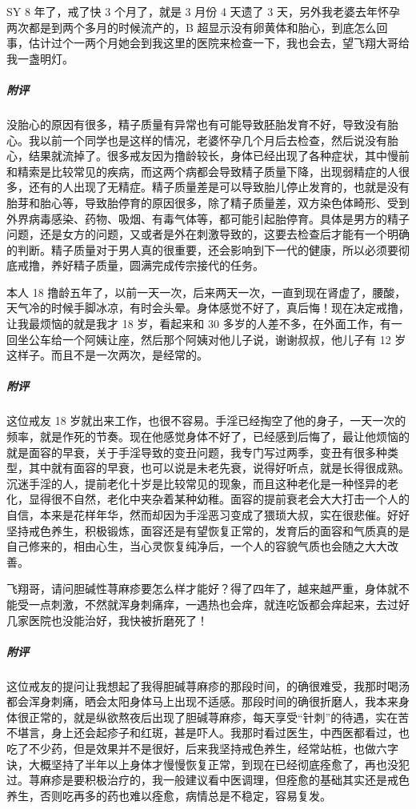 \begin{case}
    SY 8 年了，戒了快 3 个月了，就是 3 月份 4 天遗了 3 天，另外我老婆去年怀孕两次都是到两个多月的时候流产的，B 超显示没有卵黄体和胎心，到底怎么回事，估计过个一两个月她会到我这里的医院来检查一下，我也会去，望飞翔大哥给我一盏明灯。
    \subparagraph{附评} 没胎心的原因有很多，精子质量有异常也有可能导致胚胎发育不好，导致没有胎心。我以前一个同学也是这样的情况，老婆怀孕几个月后去检查，然后说没有胎心，结果就流掉了。很多戒友因为撸龄较长，身体已经出现了各种症状，其中慢前和精索是比较常见的疾病，而这两个病都会导致精子质量下降，出现弱精症的人很多，还有的人出现了无精症。精子质量差是可以导致胎儿停止发育的，也就是没有胎芽和胎心等，导致胎停育的原因很多，除了精子质量差，双方染色体畸形、受到外界病毒感染、药物、吸烟、有毒气体等，都可能引起胎停育。具体是男方的精子问题，还是女方的问题，又或者是外在刺激导致的，这要去检查后才能有一个明确的判断。精子质量对于男人真的很重要，还会影响到下一代的健康，所以必须要彻底戒撸，养好精子质量，圆满完成传宗接代的任务。
\end{case}

\begin{case}
    本人 18 撸龄五年了，以前一天一次，后来两天一次，一直到现在肾虚了，腰酸，天气冷的时候手脚冰凉，有时会头晕。身体感觉不好了，真后悔！现在决定戒撸，让我最烦恼的就是我才 18 岁，看起来和 30 多岁的人差不多，在外面工作，有一回坐公车给一个阿姨让座，然后那个阿姨对他儿子说，谢谢叔叔，他儿子有 12 岁这样子。而且不是一次两次，是经常的。
    \subparagraph{附评} 这位戒友 18 岁就出来工作，也很不容易。手淫已经掏空了他的身子，一天一次的频率，就是作死的节奏。现在他感觉身体不好了，已经感到后悔了，最让他烦恼的就是面容的早衰，关于手淫导致的变丑问题，我专门写过两季，变丑有很多种类型，其中就有面容的早衰，也可以说是未老先衰，说得好听点，就是长得很成熟。沉迷手淫的人，提前老化十岁是比较常见的现象，而且这种老化是一种怪异的老化，显得很不自然，老化中夹杂着某种幼稚。面容的提前衰老会大大打击一个人的自信，本来是花样年华，然而却因为手淫恶习变成了猥琐大叔，实在很悲催。好好坚持戒色养生，积极锻炼，面容还是有望恢复正常的，发育后的面容和气质真的是自己修来的，相由心生，当心灵恢复纯净后，一个人的容貌气质也会随之大大改善。
\end{case}

\begin{case}
    飞翔哥，请问胆碱性荨麻疹要怎么样才能好？得了四年了，越来越严重，身体就不能受一点刺激，不然就浑身刺痛痒，一遇热也会痒，就连吃饭都会痒起来，去过好几家医院也没能治好，我快被折磨死了！
    \subparagraph{附评} 这位戒友的提问让我想起了我得胆碱荨麻疹的那段时间，的确很难受，我那时喝汤都会浑身刺痛，晒会太阳身体马上出现不适感。那段时间的确很折磨人，我本来身体很正常的，就是纵欲熬夜后出现了胆碱荨麻疹，每天享受“针刺”的待遇，实在苦不堪言，身上还会起疹子和红斑，甚是吓人。我那时看过医生，中西医都看过，也吃了不少药，但是效果并不是很好，后来我坚持戒色养生，经常站桩，也做六字诀，大概坚持了半年以上身体才慢慢恢复正常，到现在已经彻底痊愈了，再也没犯过。荨麻疹是要积极治疗的，我一般建议看中医调理，但痊愈的基础其实还是戒色养生，否则吃再多的药也难以痊愈，病情总是不稳定，容易复发。
\end{case}

